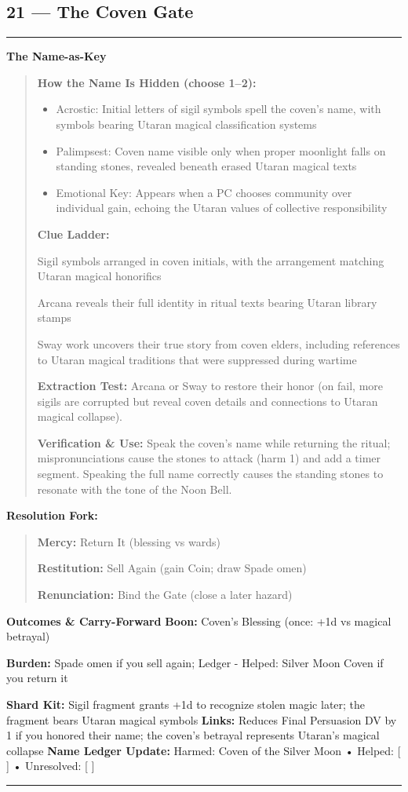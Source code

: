 \documentclass[18pt, letterpaper, twoside]{article}
\newenvironment{floorbox}[1]{%
    \begin{center}
    \begin{minipage}{0.95\textwidth}
    \subsection*{#1}
    \vspace{-0.5em}
    \rule{\textwidth}{0.5pt}
    \vspace{0.5em}
}{%
    \vspace{0.5em}
    \rule{\textwidth}{0.5pt}
    \end{minipage}
    \end{center}
}
\newenvironment{gmnote}[1]{%
    \vspace{0.5em}
    \noindent\textbf{#1}
    \begin{quote}
}{%
    \end{quote}
    \vspace{0.5em}
}
\newenvironment{resolutionbox}{%
    \vspace{0.5em}
    \noindent\textbf{Resolution Fork:}
    \begin{quote}
}{%
    \end{quote}
    \vspace{0.5em}
}
\newcommand{\boon}[1]{\noindent\textbf{Boon:} #1\par}
\newcommand{\burden}[1]{\noindent\textbf{Burden:} #1\par}
\begin{document}
\begin{floorbox}{21 --- The Coven Gate}
\begin{gmnote}{The Name-as-Key}
\textbf{How the Name Is Hidden (choose 1--2):}
\begin{itemize}[leftmargin=*]
    \item Acrostic: Initial letters of sigil symbols spell the coven's name, with symbols bearing Utaran magical classification systems
    \item Palimpsest: Coven name visible only when proper moonlight falls on standing stones, revealed beneath erased Utaran magical texts
    \item Emotional Key: Appears when a PC chooses community over individual gain, echoing the Utaran values of collective responsibility
\end{itemize}

\textbf{Clue Ladder:}
\begin{description}[leftmargin=*, style=unboxed]
    \item[Gentle Nudge:] Sigil symbols arranged in coven initials, with the arrangement matching Utaran magical honorifics
    \item[Actionable Lead:] Arcana reveals their full identity in ritual texts bearing Utaran library stamps
    \item[Aha! Proof:] Sway work uncovers their true story from coven elders, including references to Utaran magical traditions that were suppressed during wartime
\end{description}

\textbf{Extraction Test:} Arcana or Sway to restore their honor (on fail, more sigils are corrupted but reveal coven details and connections to Utaran magical collapse).

\textbf{Verification \& Use:} Speak the coven's name while returning the ritual; mispronunciations cause the stones to attack (harm 1) and add a timer segment. Speaking the full name correctly causes the standing stones to resonate with the tone of the Noon Bell.
\end{gmnote}

\begin{resolutionbox}
\textbf{Mercy:} Return It (blessing vs wards)

\textbf{Restitution:} Sell Again (gain Coin; draw Spade omen)

\textbf{Renunciation:} Bind the Gate (close a later hazard)
\end{resolutionbox}

\textbf{Outcomes \& Carry-Forward}
\boon{Coven's Blessing (once: +1d vs magical betrayal)}
\burden{Spade omen if you sell again; Ledger - Helped: Silver Moon Coven if you return it}
\textbf{Shard Kit:} Sigil fragment grants +1d to recognize stolen magic later; the fragment bears Utaran magical symbols
\textbf{Links:} Reduces Final Persuasion DV by 1 if you honored their name; the coven's betrayal represents Utaran's magical collapse
\textbf{Name Ledger Update:} Harmed: Coven of the Silver Moon • Helped: [ ] • Unresolved: [ ]


\end{floorbox}
\end{document}
